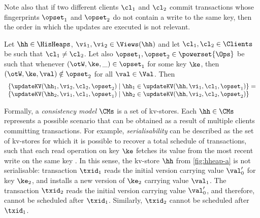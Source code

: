 Note also that if two different clients $\cl_1$ and $\cl_2$ commit transactions 
whose fingerprints $\opset_1$ and $\opset_2$ do not contain a write 
to the same key, then the order in which the updates are executed is 
not relevant. 
\begin{proposition}
\label{prop:updatekv.comm}
\label{prop:swap-update}
Let $\hh \in \HisHeaps$, $\vi_1, \vi_2 \in \Views(\hh)$ and let $\cl_1, \cl_2 \in \Clients$ 
be such that $\cl_1 \neq \cl_2$. 
Let also $\opset_1, \opset_2 \in \powerset{\Ops}$ be such that 
whenever $(\otW, \ke, \_) \in \opset_1$ for some key $\ke$, then 
$(\otW, \ke, \val) \notin \opset_2$ for all $\val \in \Val$. Then 
\[
\begin{array}{l}
\{ \updateKV(\hh_1, \vi_2, \cl_2, \opset_2) \mid \hh_1 \in \updateKV(\hh, \vi_1, \cl_1, \opset_1)\} = \\
\{ \updateKV(\hh_2, \vi_1, \cl_1, \opset_1) \mid \hh_2 \in \updateKV(\hh, \vi_2, \cl_2, \opset_2)\}\\
\end{array}
\]
\end{proposition}

Formally, a \emph{consistency model} $\CMs$ is a 
set of kv-stores. Each $\hh \in \CMs$ represents a possible scenario that 
can be obtained as a result of multiple clients committing transactions. 
For example, \emph{serialisability} can be described as the set 
of kv-stores for which it is possible to recover a total schedule of transactions, 
such that each read operation on key $\ke$ fetches its value from the 
most recent write on the same key \cite{}.
In this sense, the kv-store $\hh$ from \cref{fig:hheap-a} is not serialisable: 
transaction $\txid_1$ reads the initial version carrying value $\val'_0$ for key $\ke_{2}$, 
and installs a new version of $\ke_{2}$ carrying value $\val_1$. The transaction $\txid_2$ 
reads the initial version carrying value $\val'_0$, and therefore, 
cannot be scheduled after $\txid_1$. Similarly, $\txid_2$ cannot be scheduled after $\txid_1$.

